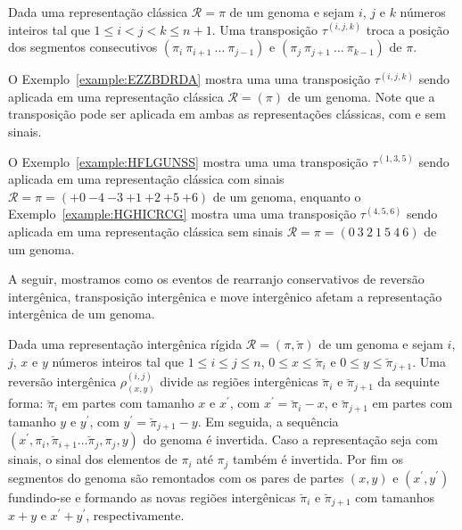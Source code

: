 



\begin{definition}
Dada uma representação clássica $\mathcal{R} = \pi$ de um genoma e sejam $i$, $j$ e $k$ números inteiros tal que $1 \le i < j < k \le n + 1$. Uma transposição $\tau^{(i,j,k)}$ troca a posição dos segmentos consecutivos $(\pi_i~\pi_{i+1}~\dots~\pi_{j-1})$ e $(\pi_j~\pi_{j+1}~\dots~\pi_{k-1})$ de $\pi$.
\end{definition}

O Exemplo~\ref{example:EZZBDRDA} mostra uma uma transposição $\tau^{(i,j,k)}$ sendo aplicada em uma representação clássica $\mathcal{R} = (\pi)$ de um genoma. Note que a transposição pode ser aplicada em ambas as representações clássicas, com e sem sinais.



O Exemplo~\ref{example:HFLGUNSS} mostra uma uma transposição $\tau^{(1,3,5)}$ sendo aplicada em uma representação clássica com sinais $\mathcal{R} = \pi = ({+0}~{-4}~{-3}~{+1}~{+2}~{+5}~{+6})$ de um genoma, enquanto o Exemplo~\ref{example:HGHICRCG} mostra uma uma transposição $\tau^{(4,5,6)}$ sendo aplicada em uma representação clássica sem sinais $\mathcal{R} = \pi = ({0}~{3}~{2}~{1}~{5}~{4}~{6})$ de um genoma.





A seguir, mostramos como os eventos de rearranjo conservativos de reversão intergênica, transposição intergênica e move intergênico afetam a representação intergênica de um genoma. 

\begin{definition}
Dada uma representação intergênica rígida $\mathcal{R} = (\pi,\breve\pi)$ de um genoma e sejam $i$, $j$, $x$ e $y$ números inteiros tal que $1 \le i \le j \le n$, $0 \le x \le \breve\pi_i$ e $0 \le y \le \breve\pi_{j+1}$. Uma reversão intergênica $\rho^{(i, j)}_{(x, y)}$ divide as regiões intergênicas $\breve\pi_i$ e $\breve\pi_{j+1}$ da sequinte forma: $\breve\pi_i$ em partes com tamanho $x$ e $x^{\prime}$, com $x^{\prime}=\breve\pi_i-x$, e $\breve\pi_{j+1}$ em partes com tamanho $y$ e $y^{\prime}$, com $y^{\prime}=\breve\pi_{j+1}-y$. Em seguida, a sequência $(x^{\prime},\pi_i,\breve\pi_{i+1}\dots\breve\pi_j,\pi_j,y)$ do genoma é invertida. Caso a representação seja com sinais, o sinal dos elementos de $\pi_i$ até $\pi_{j}$ também é invertida. Por fim os segmentos do genoma são remontados com os pares de partes $(x,y)$ e $(x^{\prime},y^{\prime})$ fundindo-se e formando as novas regiões intergênicas $\breve\pi_i$ e $\breve\pi_{j+1}$ com tamanhos $x + y$ e $x^{\prime}+y^{\prime}$, respectivamente.
\end{definition}

